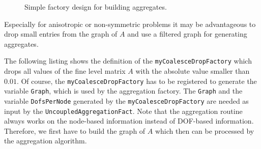\documentclass[10pt,fleqn]{book}
\begin{document}
\begin{figure}
\begin{center}
{
} %
\end{center}
\caption{Simple factory design for building aggregates.}
\label{fig:simpledesignaggregates}
\end{figure}


Especially for anisotropic or non-symmetric problems it may be advantageous to drop small entries from the graph of $A$ and use a filtered graph for generating aggregates.

The following listing shows the definition of the \verb|myCoalesceDropFactory| which drops all values of the fine level matrix $A$ with the absolute value smaller than $0.01$. Of course, the \verb|myCoalesceDropFactory| has to be registered to generate the variable \verb|Graph|, which is used by the aggregation factory.
The \verb|Graph| and the variable \verb|DofsPerNode| generated by the \verb|myCoalesceDropFactory| are needed as input by the \verb|UncoupledAggregationFact|. Note that the aggregation routine always works on the node-based information instead of DOF-based information. Therefore, we first have to build the graph of $A$ which then can be processed by the aggregation algorithm.


\end{document}
